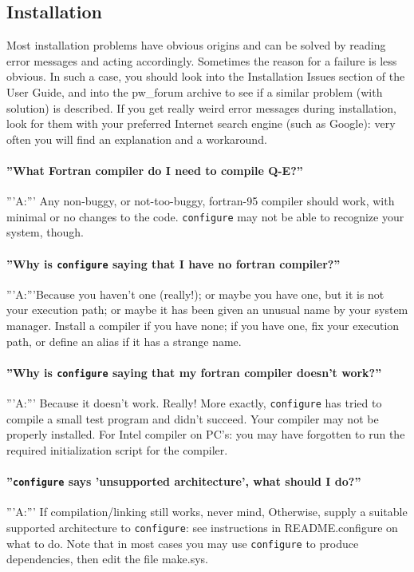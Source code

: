 \documentclass[12pt,a4paper]{article}
\begin{document}
\subsection{Installation}

Most installation problems have obvious origins and can be solved by reading
error messages and acting accordingly. Sometimes the reason for a failure
is less obvious. In such a case, you should look into the Installation
Issues section of the User Guide, and into the pw\_forum archive to
see if a similar problem (with solution) is described. If you get
really weird error messages during installation, look for them with
your preferred Internet search engine (such as Google): very often you
will find an explanation and a workaround. 

\paragraph{ ''What Fortran compiler do I need to compile Q-E?''}
'''A:''' Any non-buggy, or not-too-buggy, fortran-95 compiler should work,
with minimal or no changes to the code. \texttt{configure} may not be able to
recognize your system, though.

\paragraph{ ''Why is \texttt{configure} saying that I have no fortran compiler?''}
'''A:'''Because you haven't one (really!); or maybe you have one, but it is 
not your execution path; or maybe it has been given an unusual name by your 
system manager. Install a compiler if you have none; if you have one, fix 
your execution path, or define an alias if it has a strange name.

\paragraph{ ''Why is \texttt{configure} saying that my fortran compiler doesn't work?''}
'''A:''' Because it doesn't work. Really! More exactly, \texttt{configure} has tried 
to compile a small test program and didn't succeed. Your compiler may not be 
properly installed. For Intel compiler on PC's: you may have forgotten to run 
the required initialization script for the compiler.

\paragraph{ ''\texttt{configure} says 'unsupported architecture', what should I do?''}
'''A:''' If compilation/linking still works, never mind, Otherwise,
supply a suitable  
supported architecture to \texttt{configure}: see instructions in README.configure on 
what to do. Note that in most cases you may use \texttt{configure} to produce dependencies, 
then edit the file make.sys.
\end{document}
